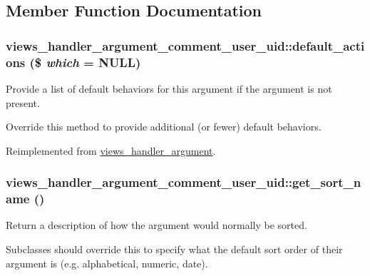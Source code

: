 \subsection{Member Function Documentation}
\hypertarget{classviews__handler__argument__comment__user__uid_a492e0d7daafffc95f6ac936111556559}{
\subsubsection[{default\_\-actions}]{\setlength{\rightskip}{0pt plus 5cm}views\_\-handler\_\-argument\_\-comment\_\-user\_\-uid::default\_\-actions (\$ {\em which} = {\ttfamily NULL})}}
\label{classviews__handler__argument__comment__user__uid_a492e0d7daafffc95f6ac936111556559}
Provide a list of default behaviors for this argument if the argument is not present.

Override this method to provide additional (or fewer) default behaviors. 

Reimplemented from \hyperlink{classviews__handler__argument_abf38ef334b6e18e0aa43e5a829e3ce33}{views\_\-handler\_\-argument}.\hypertarget{classviews__handler__argument__comment__user__uid_a8f744e47fec12bc54c231f8a41a3447d}{
\subsubsection[{get\_\-sort\_\-name}]{\setlength{\rightskip}{0pt plus 5cm}views\_\-handler\_\-argument\_\-comment\_\-user\_\-uid::get\_\-sort\_\-name ()}}
\label{classviews__handler__argument__comment__user__uid_a8f744e47fec12bc54c231f8a41a3447d}
Return a description of how the argument would normally be sorted.

Subclasses should override this to specify what the default sort order of their argument is (e.g. alphabetical, numeric, date). 

